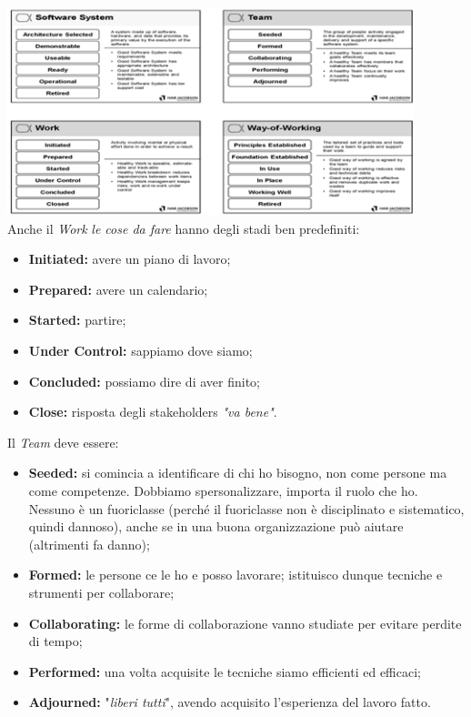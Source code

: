 \includegraphics[width=0.5\columnwidth]{img7}\\
Anche il \textit{Work} \textit{le cose da fare} hanno degli stadi ben predefiniti:
\begin{itemize}
	\item \textbf{Initiated:} avere un piano di lavoro;
	\item \textbf{Prepared:} avere un calendario;
	\item \textbf{Started:} partire;
	\item \textbf{Under Control:} sappiamo dove siamo;
	\item \textbf{Concluded:} possiamo dire di aver finito;
	\item \textbf{Close:} risposta degli stakeholders \textit{"va bene"}.
\end{itemize}
Il \textit{Team} deve essere:
\begin{itemize}
	\item \textbf{Seeded:} si comincia a identificare di chi ho bisogno, non come persone ma come competenze. Dobbiamo spersonalizzare, importa il ruolo che ho. Nessuno è un fuoriclasse (perché il fuoriclasse non è disciplinato e sistematico, quindi dannoso), anche se in una buona organizzazione può aiutare (altrimenti fa danno);
	\item \textbf{Formed:} le persone ce le ho e posso lavorare; istituisco dunque tecniche e strumenti per collaborare;
	\item \textbf{Collaborating:} le forme di collaborazione vanno studiate per evitare perdite di tempo;
	\item \textbf{Performed:} una volta acquisite le tecniche siamo efficienti ed efficaci;
	\item \textbf{Adjourned:} "\textit{liberi tutti}", avendo acquisito l'esperienza del lavoro fatto.
\end{itemize}
